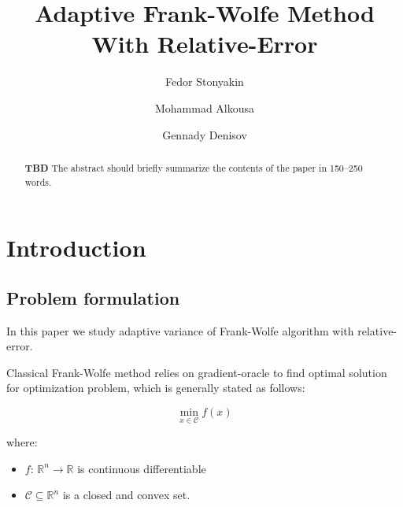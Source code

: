 \documentclass[runningheads, final]{llncs}
\begin{document}
%
\title{Adaptive Frank-Wolfe Method With Relative-Error }
%
%
\author{Fedor Stonyakin \and
    Mohammad Alkousa \and
    Gennady Denisov}
%
%
%
\maketitle              %
%
\begin{abstract}
    \textbf{TBD} The abstract should briefly summarize the contents of the paper in
    150--250 words.

\end{abstract}
%
%
%
\section{Introduction}
\subsection{Problem formulation}

In this paper we study adaptive variance of Frank-Wolfe
\cite{frankwolfe:1956} algorithm with relative-error.

Classical Frank-Wolfe method relies on gradient-oracle to find optimal solution
for optimization problem, which is generally stated as follows:

\begin{equation}\label{eq:optimization}
    \min_{x \in \mathcal{C}} f(x)
\end{equation}

where:

\begin{itemize}
    \item $f$: $\mathbb{R}^n \rightarrow \mathbb{R}$ is continuous
          differentiable
    \item $\mathcal{C} \subseteq \mathbb{R}^n$ is a closed and convex set.
\end{itemize}
\end{document}
